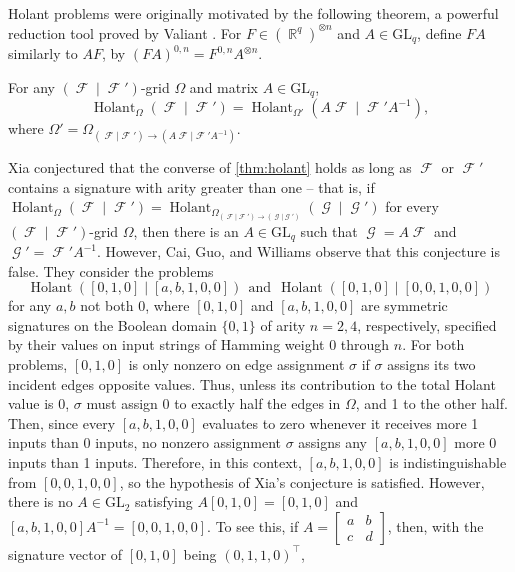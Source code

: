 \documentclass{theoretics}
\DeclareMathOperator{\rr}{\mathbb{R}}
\DeclareMathOperator{\fc}{\mathcal{F}}
\DeclareMathOperator{\gc}{\mathcal{G}}
\DeclareMathOperator{\holant}{Holant}
\begin{document}
Holant problems were originally motivated by the following theorem, a powerful reduction tool
proved by Valiant \cite{valiant}.
For $F \in (\rr^q)^{\otimes n}$ and $A \in \text{GL}_q$, define $FA$ similarly
to $AF$, by $(FA)^{0,n} = F^{0,n}A^{\otimes n}$.
\begin{theorem}
    For any $(\fc \mid \fc')$-grid $\Omega$ and matrix $A \in \text{GL}_q$,
    \[
        \holant_{\Omega}(\fc \mid \fc') = \holant_{\Omega'}
        (A\fc \mid \fc' A^{-1}),
    \]
    where $\Omega' = \Omega_{(\fc|\fc') \to (A\fc | \fc' A^{-1})}$.
    \label{thm:holant}
\end{theorem}
Xia \cite{xia} conjectured that the converse of \autoref{thm:holant} holds as long as
$\fc$ or $\fc'$ contains a signature with arity greater than one -- that is, if 
$\holant_{\Omega}(\fc \mid \fc') = \holant_{\Omega_{(\fc|\fc') \to (\gc | \gc')}}(\gc \mid \gc')$
for every $(\fc \mid \fc')$-grid $\Omega$, then there is an $A \in \text{GL}_q$ 
such that $\gc = A\fc$ and $\gc' = \fc' A^{-1}$. However, Cai, Guo, and Williams
\cite[Section 4.3]{cai_complete_2016} observe that this conjecture is false. They consider the problems
\[
    \holant([0,1,0] \mid [a,b,1,0,0]) ~~\text{and}~~ \holant([0,1,0] \mid [0,0,1,0,0])
\]
for any $a,b$ not both 0,
where $[0,1,0]$ and $[a,b,1,0,0]$ are symmetric signatures on the Boolean domain $\{0,1\}$ 
of arity $n=2,4$, respectively, specified by their values on input strings of Hamming
weight $0$ through $n$.
For both problems, $[0,1,0]$ is only nonzero on edge assignment $\sigma$ if $\sigma$ assigns its two
incident edges opposite values. Thus, unless its contribution to the total Holant value is 0, 
$\sigma$ must assign 0 to exactly half the edges in $\Omega$, and 1 to the other half. Then, since
every $[a,b,1,0,0]$ evaluates to zero
whenever it receives more 1 inputs than 0 inputs, no nonzero assignment $\sigma$ assigns any
$[a,b,1,0,0]$ more 0 inputs than 1 inputs. Therefore, in this context,
$[a,b,1,0,0]$ is indistinguishable from $[0,0,1,0,0]$, so the hypothesis of Xia's conjecture is satisfied. 
However, there is no $A \in \text{GL}_2$ satisfying $A[0,1,0] = [0,1,0]$ and 
$[a,b,1,0,0]A^{-1} = [0,0,1,0,0]$. To see this, if $A = \begin{bmatrix} a & b \\ c & d\end{bmatrix}$, then, with the signature vector of $[0,1,0]$ being $(0,1,1,0)^\top$,
\end{document}
